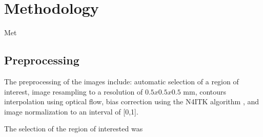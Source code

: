 \section{Methodology}
\label{sec:methods}
Met

\subsection{Preprocessing}
\label{subsec:prepro}
The preprocessing of the images include: automatic selection of a region
of interest, image resampling to a resolution of $0.5 x 0.5 x 0.5$ mm, contours interpolation
using optical flow, bias correction using the N4ITK algorithm \cite{n4itk}, and
image normalization to an interval of [0,1].

The selection of the region of interested was  
